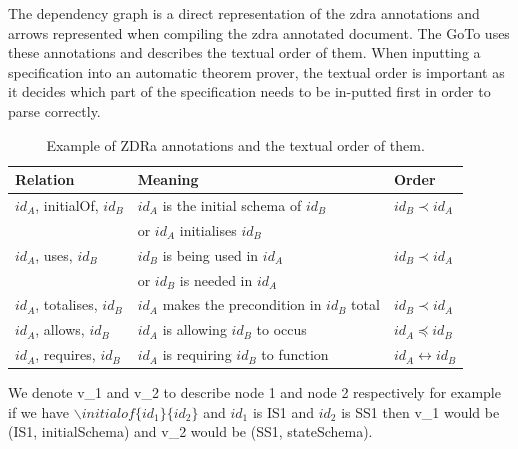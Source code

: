 The dependency graph is a direct representation of the \gls{zdra} annotations and arrows represented when compiling the \gls{zdra} annotated document. The GoTo uses these annotations and describes the textual order of them. When inputting a specification into an automatic theorem prover, the textual order is important as it decides which part of the specification needs to be in-putted first in order to parse correctly.

\begin{table}[H]
\centering
\begin{tabular}{| l | l | l |}
\hline
\textbf{Relation} & \textbf{Meaning} & \textbf{Order} \\
\hline 
$id_{A}$, initialOf, $id_{B}$ & $id_{A}$ is the initial schema of $id_{B}$ & $id_{B} \prec id_{A}$ \\
 & or $id_{A}$ initialises $id_{B}$ & \\
 \hline
$id_{A}$, uses, $id_{B}$ & $id_{B}$ is being used in $id_{A}$ & $id_{B} \prec id_{A}$ \\
& or $id_{B}$ is needed in $id_{A}$ & \\
 \hline
 $id_{A}$, totalises, $id_{B}$ & $id_{A}$ makes the precondition in $id_{B}$ total & $id_{B} \prec id_{A}$ \\
 \hline
$id_{A}$, allows, $id_{B}$ & $id_{A}$ is allowing $id_{B}$ to occus & $id_{A} \preceq id_{B}$ \\
\hline
$id_{A}$, requires, $id_{B}$ & $id_{A}$ is requiring $id_{B}$ to function & $id_{A} \leftrightarrow id_{B}$ \\
\hline
\end{tabular}
\caption{Example of ZDRa annotations and the textual order of them. \label{tab:texorder}}
\end{table}

\begin{defin}
We denote v\_1 and v\_2 to describe node 1 and node 2 respectively for example if we have $\backslash initialof\{id_{1}\}\{id_{2}\}$ and $id_{1}$ is IS1 and $id_{2}$ is SS1 then v\_1 would be (IS1, initialSchema) and v\_2 would be (SS1, stateSchema).
\end{defin}


